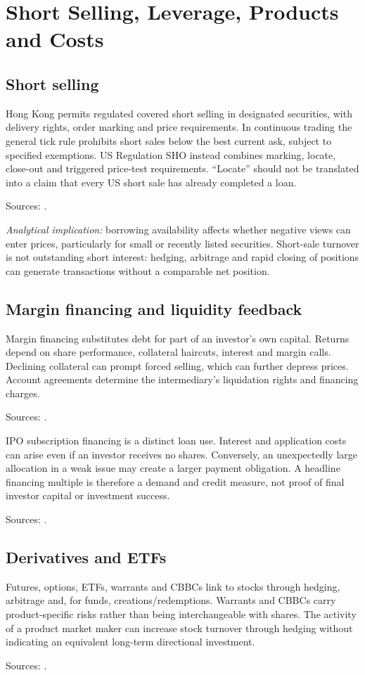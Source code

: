 \documentclass[11pt,a4paper]{article}
\newcommand{\source}[1]{\par{\footnotesize\color{ink}Sources: \cite{#1}.}\par}
\begin{document}
\section{Short Selling, Leverage, Products and Costs}
\subsection{Short selling}
Hong Kong permits regulated covered short selling in designated securities, with delivery rights, order marking and price requirements. In continuous trading the general tick rule prohibits short sales below the best current ask, subject to specified exemptions. US Regulation SHO instead combines marking, locate, close-out and triggered price-test requirements. ``Locate'' should not be translated into a claim that every US short sale has already completed a loan.\source{short,regsho}

\textit{Analytical implication:} borrowing availability affects whether negative views can enter prices, particularly for small or recently listed securities. Short-sale turnover is not outstanding short interest: hedging, arbitrage and rapid closing of positions can generate transactions without a comparable net position.

\subsection{Margin financing and liquidity feedback}
Margin financing substitutes debt for part of an investor's own capital. Returns depend on share performance, collateral haircuts, interest and margin calls. Declining collateral can prompt forced selling, which can further depress prices. Account agreements determine the intermediary's liquidation rights and financing charges.\source{ifecother}

IPO subscription financing is a distinct loan use. Interest and application costs can arise even if an investor receives no shares. Conversely, an unexpectedly large allocation in a weak issue may create a larger payment obligation. A headline financing multiple is therefore a demand and credit measure, not proof of final investor capital or investment success.\source{ifecipo}

\subsection{Derivatives and ETFs}
Futures, options, ETFs, warrants and CBBCs link to stocks through hedging, arbitrage and, for funds, creations/redemptions. Warrants and CBBCs carry product-specific risks rather than being interchangeable with shares. The activity of a product market maker can increase stock turnover through hedging without indicating an equivalent long-term directional investment.\source{structured}
\end{document}
